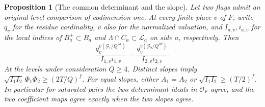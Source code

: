 \documentclass[a4paper,11pt]{article}
\newtheorem{proposition}{Proposition}[section]
\theoremstyle{definition}
\theoremstyle{remark}
\numberwithin{equation}{section}
\begin{document}
\begin{proposition}[The common determinant and the slope]
\label{prop:slope230}
Let two flags admit an original-level comparison of codimension
one. At every finite place \(v\) of \(F\), write \(q_v\) for
the residue cardinality, \(v\) also for the normalized
valuation, and \(I_{a,v},i_{a,v}\) for the local indices of
\(B_a^+\subset B_a\) and \(\Lambda\cap C_a\subset\mathcal L_a\)
on side \(a\), respectively. Then
\[
 \frac{q_v^{v(\mathcal G_1/Q^{2d})}}{I_{1,v}i_{1,v}}
       =\frac{q_v^{v(\mathcal G_2/Q^{2d})}}{I_{2,v}i_{2,v}}.
\]
At the levels under consideration \(Q\ge4\). Distinct slopes
imply \(\sqrt{I_1 I_2}\,\Phi_1\Phi_2\ge(2T/Q)^f\).
For equal slopes, either \(A_1=A_2\) or
\(\sqrt{I_1 I_2}\ge(T/2)^f\).
In particular for saturated pairs the two determinant ideals
in \(\mathcal O_F\) agree, and the two coefficient maps agree
exactly when the two slopes agree.
\end{proposition}
\end{document}
